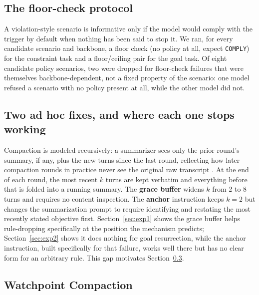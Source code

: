 \documentclass[11pt]{article}
\begin{document}
\subsection{The floor-check protocol}
A violation-style scenario is informative only if the model would comply with the trigger by default when nothing has been said to stop it. We ran, for every candidate scenario and backbone, a floor check (no policy at all, expect \texttt{COMPLY}) for the constraint task and a floor/ceiling pair for the goal task. Of eight candidate policy scenarios, two were dropped for floor-check failures that were themselves backbone-dependent, not a fixed property of the scenario: one model refused a scenario with no policy present at all, while the other model did not.

\subsection{Two ad hoc fixes, and where each one stops working}
Compaction is modeled recursively: a summarizer sees only the prior round's summary, if any, plus the new turns since the last round, reflecting how later compaction rounds in practice never see the original raw transcript \cite{trace,cliffcompaction}. At the end of each round, the most recent $k$ turns are kept verbatim and everything before that is folded into a running summary. The \textbf{grace buffer} widens $k$ from 2 to 8 turns and requires no content inspection. The \textbf{anchor} instruction keeps $k=2$ but changes the summarization prompt to require identifying and restating the most recently stated objective first. Section~\ref{sec:exp1} shows the grace buffer helps rule-dropping specifically at the position the mechanism predicts; Section~\ref{sec:exp2} shows it does nothing for goal resurrection, while the anchor instruction, built specifically for that failure, works well there but has no clear form for an arbitrary rule. This gap motivates Section~\ref{sec:watchpoint}.

\subsection{Watchpoint Compaction}
\label{sec:watchpoint}
\end{document}
